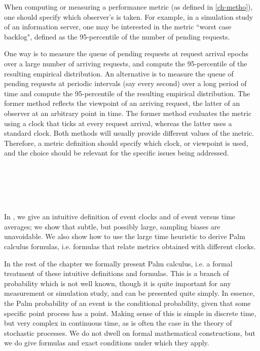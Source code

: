\begin{minipage}[b]{0.50\textwidth}
When computing or measuring a performance metric (as
defined in \cref{ch-metho}), one should specify which
observer's  is taken. For example, in a
simulation study of an information server, one may be
interested in the metric ``worst case backlog",
defined as the 95-percentile of the number of pending
requests.

One way is to measure the queue of pending requests at request
arrival epochs over a large number of arriving requests, and compute
the 95-percentile of the resulting empirical distribution. An
alternative is to measure the queue of pending requests at periodic
intervals (say every second) over a long period of time and compute
the 95-percentile of the resulting empirical distribution. The
former method reflects the viewpoint of an arriving request, the
latter of an observer at an arbitrary point in time. The former
method evaluates the metric using a clock that ticks at every
request arrival, whereas the latter uses a standard clock. Both
methods will usually provide different values of the metric.
Therefore, a metric definition should specify which clock, or
viewpoint is used, and the choice should be relevant for the
specific issues being addressed.
\end{minipage}
%
\begin{minipage}[b]{0.50\textwidth}
 ~\\
~\\
~\\
~\\
\end{minipage}

In , we give an intuitive definition of event
clocks and of event versus time averages; we show that subtle, but
possibly large, sampling biases are unavoidable. We also show how to
use the large time heuristic to derive Palm calculus formulas, i.e.
formulas that relate metrics obtained with different clocks.

In the rest of the chapter we formally present Palm calculus, i.e. a
formal treatment of these intuitive definitions and formulas. This
is a branch of probability which is not well known, though it is
quite important for any measurement or simulation study, and can be
presented quite simply. In essence, the Palm probability of an event
is the conditional probability, given that some specific point
process has a point. Making sense of this is simple in discrete
time, but very complex in continuous time, as is often the case in
the theory of stochastic processes. We do not dwell on formal
mathematical constructions, but we do give formulas and exact
conditions under which they apply.

